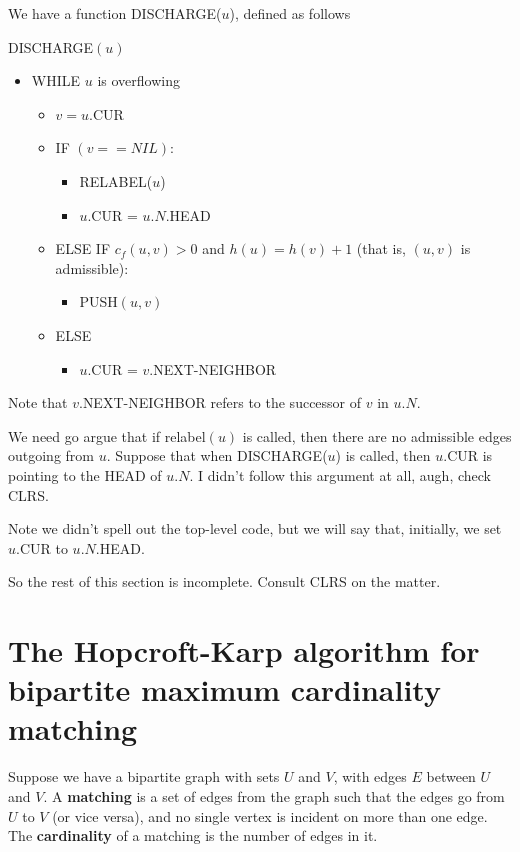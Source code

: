 \documentclass{article}
\begin{document}
We have a function DISCHARGE($u$), defined as follows

DISCHARGE$(u)$
\begin{itemize}
	\item
	WHILE $u$ is overflowing
		\begin{itemize}
			\item
			$v = u.$CUR
			
			\item
			IF $(v == NIL)$:
				\begin{itemize}
					\item
					RELABEL($u$)
					
					\item
					$u.$CUR = $u.N.$HEAD
				\end{itemize}
			
			\item
			ELSE IF $c_f(u,v) > 0$ and $h(u) = h(v) + 1$ (that is, $(u,v)$
			is admissible):
				\begin{itemize}	
					\item
					PUSH$(u,v)$
				\end{itemize}
			\item
			ELSE
				\begin{itemize}
					\item
					$u.$CUR = $v.$NEXT-NEIGHBOR
				\end{itemize}
		\end{itemize}
\end{itemize}
Note that $v.$NEXT-NEIGHBOR refers to the successor of $v$ in $u.N$.

We need go argue that if relabel$(u)$ is called, then there are no
admissible edges outgoing from $u$.
Suppose that when DISCHARGE($u$) is called, then $u.$CUR is pointing
to the HEAD of $u.N$.
I didn't follow this argument at all, augh, check CLRS.

Note we didn't spell out the top-level code, but we will say that, initially,
we set $u.$CUR to $u.N.$HEAD.

So the rest of this section is incomplete. Consult CLRS on the matter.


\section{The Hopcroft-Karp algorithm for bipartite maximum cardinality matching}

Suppose we have a bipartite graph with sets $U$ and $V$, with edges $E$ between
$U$ and $V$.
A \textbf{matching} is a set of edges from the graph such that the edges
go from $U$ to $V$ (or vice versa), and no single vertex is incident on more 
than one edge.
The \textbf{cardinality} of a matching is the number of edges in it.
\end{document}
